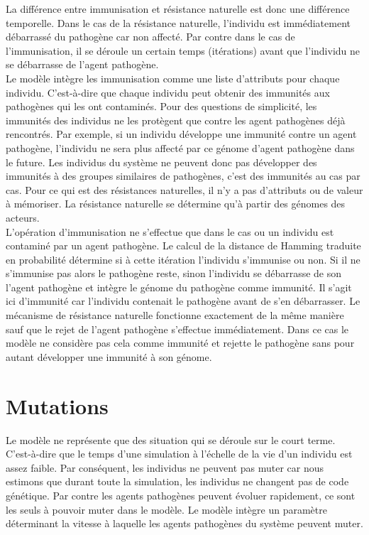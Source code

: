 La différence entre immunisation et résistance naturelle est donc une différence temporelle. Dans le cas de la résistance naturelle, l'individu est immédiatement débarrassé du pathogène car non affecté. Par contre dans le cas de l'immunisation, il se déroule un certain temps (itérations) avant que l'individu ne se débarrasse de l'agent pathogène.\\

Le modèle intègre les immunisation comme une liste d'attributs pour chaque individu. C'est-à-dire que chaque individu peut obtenir des immunités aux pathogènes qui les ont contaminés. Pour des questions de simplicité, les immunités des individus ne les protègent que contre les agent pathogènes déjà rencontrés. Par exemple, si un individu développe une immunité contre un agent pathogène, l'individu ne sera plus affecté par ce génome d'agent pathogène dans le future. Les individus du système ne peuvent donc pas développer des immunités à des groupes similaires de pathogènes, c'est des immunités au cas par cas. Pour ce qui est des résistances naturelles, il n'y a pas d'attributs ou de valeur à mémoriser. La résistance naturelle se détermine qu'à partir des génomes des acteurs.\\

L'opération d'immunisation ne s'effectue que dans le cas ou un individu est contaminé par un agent pathogène. Le calcul de la distance de Hamming traduite en probabilité détermine si à cette itération l'individu s'immunise ou non. Si il ne s'immunise pas alors le pathogène reste, sinon l'individu se débarrasse de son l'agent pathogène et intègre le génome du pathogène comme immunité. Il s'agit ici d'immunité car l'individu contenait le pathogène avant de s'en débarrasser. Le mécanisme de résistance naturelle fonctionne exactement de la même manière sauf que le rejet de l'agent pathogène s'effectue immédiatement. Dans ce cas le modèle ne considère pas cela comme immunité et rejette le pathogène sans pour autant développer une immunité à son génome.

\section{Mutations}

Le modèle ne représente que des situation qui se déroule sur le court terme. C'est-à-dire que le temps d'une simulation à l'échelle de la vie d'un individu est assez faible. Par conséquent, les individus ne peuvent pas muter car nous estimons que durant toute la simulation, les individus ne changent pas de code génétique. Par contre les agents pathogènes peuvent évoluer rapidement, ce sont les seuls à pouvoir muter dans le modèle. Le modèle intègre un paramètre déterminant la vitesse à laquelle les agents pathogènes du système peuvent muter.\\

